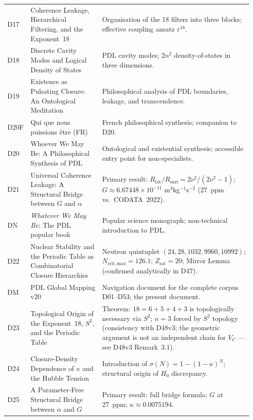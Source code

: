 \documentclass[11pt,a4paper]{article}
\theoremstyle{plain}
\theoremstyle{definition}
\theoremstyle{remark}
\begin{document}
\begin{longtable}{L{1.3cm}L{3.8cm}L{8.0cm}}
D17 & Coherence Leakage, Hierarchical Filtering, and the Exponent~18~\cite{D17} & Organisation of the 18 filters into three blocks; effective coupling ansatz $\varepsilon^{18}$.\\[0.3em]
D18 & Discrete Cavity Modes and Logical Density of States~\cite{D18} & PDL cavity modes; $2n^2$ density-of-states in three dimensions.\\[0.3em]
D19 & Existence as Pulsating Closure: An Ontological Meditation~\cite{D19} & Philosophical analysis of PDL boundaries, leakage, and transcendence.\\[0.3em]
D20F & Qui que nous puissions \^etre (FR)~\cite{D20F} & French philosophical synthesis; companion to D20.\\[0.3em]
D20 & Whoever We May Be: A Philosophical Synthesis of PDL~\cite{D20} & Ontological and existential synthesis; accessible entry point for non-specialists.\\[0.3em]
D21 & Universal Coherence Leakage: A Structural Bridge between $G$ and $\alpha$~\cite{D21} & \textcolor{proofblue}{Primary result}: $R_{\mathrm{tot}}/R_{\mathrm{surf}} = 2\nu^2/(2\nu^2-1)$; $G \approx 6.67448\times 10^{-11}$ m$^3$kg$^{-1}$s$^{-2}$ (27~ppm vs.\ CODATA~2022).\\[0.3em]
DN & \emph{Whatever We May Be}: The PDL popular book~\cite{DN} & Popular science monograph; non-technical introduction to PDL.\\[0.3em]
D22 & Nuclear Stability and the Periodic Table as Combinatorial Closure Hierarchies~\cite{D22} & Neutron quintuplet $(24,28,1032,9960,10992)$; $N_{\mathrm{crit,max}}=126.1$; $Z_{\mathrm{sat}}=20$; Mirror Lemma (confirmed analytically in D47).\\[0.3em]
DM & PDL Global Mapping v20~\cite{DMapv10} & Navigation document for the complete corpus D01--D53; the present document.\\[0.3em]
D23 & Topological Origin of the Exponent~18, $S^2$, and the Periodic Table~\cite{D23} & \textcolor{proofblue}{Theorem}: $18=6+5+4+3$ is topologically necessary via $S^2$; $n=3$ forced by $S^2$ topology (consistency with D48v3; the geometric argument is not an independent chain for $V_C$ --- see D48v3 Remark~3.1).\\[0.3em]
D24 & Closure-Density Dependence of $\kappa$ and the Hubble Tension~\cite{D24} & Introduction of $\sigma(N)=1-(1-\kappa)^N$; structural origin of $H_0$ discrepancy.\\[0.3em]
D25 & A Parameter-Free Structural Bridge between $\alpha$ and $G$~\cite{D25} & \textcolor{proofblue}{Primary result}: full bridge formula; $G$ at 27~ppm; $\kappa\approx 0.0075194$.\\[0.3em]

\end{longtable}
\end{document}
